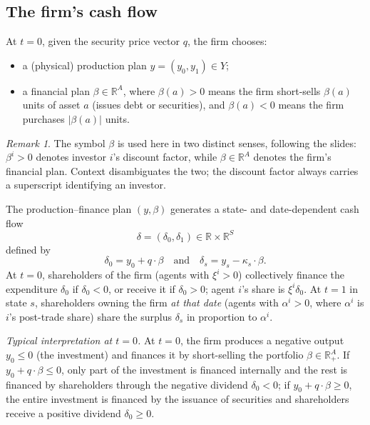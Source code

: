 \documentclass[11pt,a4paper,oneside]{book}
\def\R{\mathbb{R}}
\def\leq{\leqslant}
\def\geq{\geqslant}
\def\et{\quad \text{and} \quad}
\theoremstyle{plain}
\theoremstyle{definition}
\theoremstyle{remark}
\newtheorem{remark}[theorem]{Remark}
\numberwithin{equation}{chapter}
\begin{document}
\subsection{The firm's cash flow}

At $t=0$, given the security price vector $q$, the firm chooses:
\begin{itemize}
  \item a (physical) production plan $y = (y_0, y_1) \in Y$;
  \item a financial plan $\beta \in \R^A$, where $\beta(a) > 0$ means the firm short-sells $\beta(a)$ units of asset $a$ (issues debt or securities), and $\beta(a) < 0$ means the firm purchases $|\beta(a)|$ units.
\end{itemize}

\begin{remark}\label{rem:beta-abuse}
The symbol $\beta$ is used here in two distinct senses, following the slides: $\beta^i > 0$ denotes investor $i$'s discount factor, while $\beta \in \R^A$ denotes the firm's financial plan.
Context disambiguates the two; the discount factor always carries a superscript identifying an investor.
\end{remark}

The production--finance plan $(y, \beta)$ generates a state- and date-dependent cash flow
\begin{equation*}
  \delta = (\delta_0, \delta_1) \in \R \times \R^S
\end{equation*}
defined by
\begin{equation}\label{eq:cash-flow}
  \delta_0 = y_0 + q \cdot \beta
  \et
  \delta_s = y_s - \kappa_s \cdot \beta.
\end{equation}
At $t=0$, shareholders of the firm (agents with $\xi^i > 0$) collectively finance the expenditure $\delta_0$ if $\delta_0 < 0$, or receive it if $\delta_0 > 0$; agent $i$'s share is $\xi^i \delta_0$.
At $t=1$ in state $s$, shareholders owning the firm \emph{at that date} (agents with $\alpha^i > 0$, where $\alpha^i$ is $i$'s post-trade share) share the surplus $\delta_s$ in proportion to $\alpha^i$.

\emph{Typical interpretation at $t=0$.}
At $t=0$, the firm produces a negative output $y_0 \leq 0$ (the investment) and finances it by short-selling the portfolio $\beta \in \R^A_+$.
If $y_0 + q \cdot \beta \leq 0$, only part of the investment is financed internally and the rest is financed by shareholders through the negative dividend $\delta_0 < 0$; if $y_0 + q \cdot \beta \geq 0$, the entire investment is financed by the issuance of securities and shareholders receive a positive dividend $\delta_0 \geq 0$.
\end{document}

